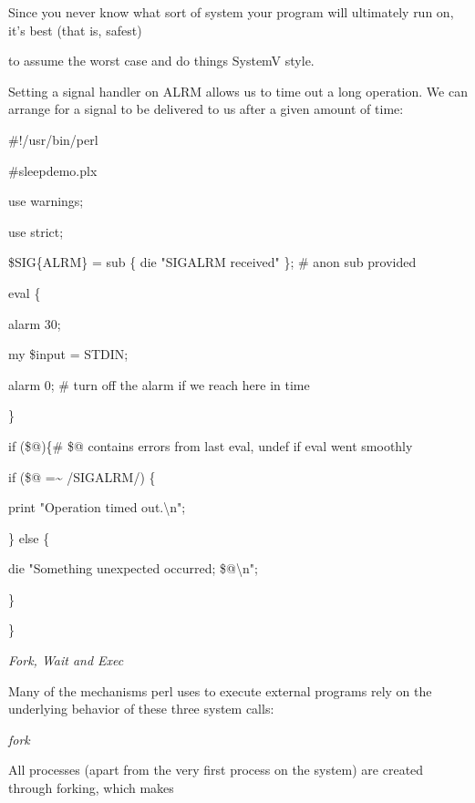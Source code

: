 \documentclass[a4paper,11pt]{book}
\begin{document}
\noindent Since you never know what sort of system your program will ultimately run on, it's best (that is, safest)

\noindent to assume the worst case and do things SystemV style.

\noindent 

\noindent Setting a signal handler on ALRM allows us to time out a long operation. We can arrange for a signal to be delivered to us after a given amount of time:

\noindent 

\noindent \#!/usr/bin/perl

\noindent \#sleepdemo.plx

\noindent use warnings;

\noindent use strict;

\noindent 

\noindent \$SIG\{ALRM\} = sub \{ die "SIGALRM received" \}; \# anon sub provided

\noindent 

\noindent eval \{

\noindent alarm 30;

\noindent my \$input = STDIN;

\noindent alarm 0; \# turn off the alarm if we reach here in time

\noindent \}

\noindent 

\noindent if  (\$@)\{\# \$@ contains errors from last eval, undef if eval went smoothly

\noindent if (\$@ =\~{} /SIGALRM/) \{

\noindent print "Operation timed out.\textbackslash n";

\noindent \} else \{

\noindent die "Something unexpected occurred; \$@\textbackslash n";

\noindent \}

\noindent \}

\noindent 

\noindent \textit{Fork, Wait and Exec}

\noindent Many of the mechanisms perl uses to execute external programs rely on the underlying behavior of these three system calls:

\noindent 

\noindent \textit{fork}

\noindent All processes (apart from the very first process on the system) are created through forking, which makes
\end{document}
